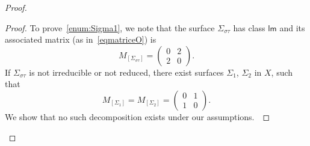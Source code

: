 \documentclass[12pt]{amsart}
\theoremstyle{remark}
\def\lll{\ensuremath{\mathsf l}}
\def\mm{\ensuremath{\mathsf m}}
\begin{document}
\begin{proof}
\begin{proof}
To prove~\ref{enum:Sigma1}, we note that the surface $\Sigma_{\sigma\tau}$ has class $\lll\mm$ and its associated matrix (as in~\eqref{eqmatriceO}) is
\[
M_{[\Sigma_{\sigma\tau}]}=\begin{pmatrix}
0 & 2 \\
2 & 0
\end{pmatrix}.
\]
If $\Sigma_{\sigma\tau}$ is not irreducible or not reduced, there   exist surfaces $\Sigma_1$, $\Sigma_2$ in $X$, such that
\begin{equation*}
M_{[\Sigma_1]}=M_{[\Sigma_2]}=\begin{pmatrix}
0 & 1 \\
1 & 0
\end{pmatrix}.
\end{equation*}
We show that no such   decomposition  exists under our assumptions.\


\end{proof}
\end{proof}
\end{document}
